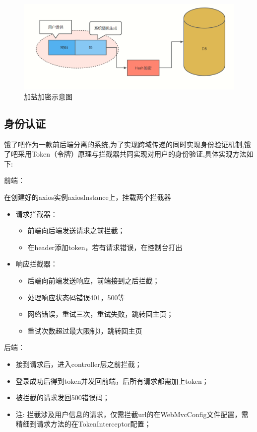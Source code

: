\begin{figure}[h]
    \centering
        \includegraphics[width=\linewidth]{pics/加盐加密.png}
    \caption{加盐加密示意图}
    \label{fig:jyjm}
\end{figure}

\subsection{身份认证}
饿了吧作为一款前后端分离的系统,为了实现跨域传递的同时实现身份验证机制,饿了吧采用Token（令牌）原理与拦截器共同实现对用户的身份验证,具体实现方法如下:

前端：

在创建好的axios实例axiosInstance上，挂载两个拦截器
\begin{itemize}
\item 请求拦截器：
\begin{itemize}
    \item 前端向后端发送请求之前拦截；
    \item 在header添加token，若有请求错误，在控制台打出
\end{itemize}
\item 响应拦截器：
\begin{itemize}
    \item 后端向前端发送响应，前端接到之后拦截；
    \item 处理响应状态码错误401，500等
    \item 网络错误，重试三次，重试失败，跳转回主页；
    \item 重试次数超过最大限制3，跳转回主页
\end{itemize}
\end{itemize}
后端：

\begin{itemize}
    \item 接到请求后，进入controller层之前拦截；
    \item 登录成功后得到token并发回前端，后所有请求都需加上token；
    \item 被拦截的请求发回500错误码；
    \footnotesize
    \item 注: 拦截涉及用户信息的请求，仅需拦截url的在WebMvcConfig文件配置，需精细到请求方法的在TokenInterceptor配置；
    \normalsize
\end{itemize}

